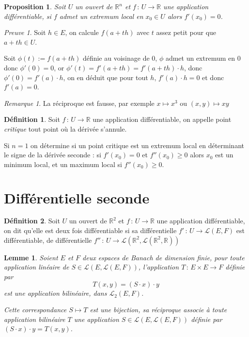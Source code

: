 \documentclass[]{article}
\newtheorem{myproposition}{Proposition}
\newtheorem{mylemma}{Lemme}
\theoremstyle{remark}
\newtheorem{myrem}{Remarque}
\newtheorem{myproof}{Preuve}
\theoremstyle{definition}
\newtheorem{mydef}{Définition}
\newcommand{\funcshort}[3]{
#1 \, : \, #2 \longrightarrow #3
}
\begin{document}
\begin{myproposition}
	Soit $U$ un ouvert de $\mathbb{R}^n$ et $\funcshort{f}{U}{\mathbb{R}}$ une application différentiable, si $f$ admet un extremum local en $x_0 \in U$ alors $f'(x_0) = 0$.
\end{myproposition}

\begin{myproof}
	Soit $h \in E$, on calcule $f(a+th)$ avec $t$ assez petit pour que $a + th \in U$.
	
	Soit $\phi(t) := f(a+th)$ définie au voisinage de 0, $\phi$ admet un extremum en 0 donc $\phi'(0) = 0$, or $\phi'(t) = f'(a+th) = f'(a+th) \cdot h$, donc $\phi'(0) = f'(a) \cdot h$, on en déduit que pour tout $h$, $f'(a) \cdot h = 0$ et donc $f'(a) = 0$.
\end{myproof}

\begin{myrem}
	La réciproque est fausse, par exemple $x \mapsto x^3$ ou $(x, y) \mapsto xy$
\end{myrem}

\begin{mydef}
	Soit $\funcshort{f}{U}{\mathbb{R}}$ une application différentiable, on appelle point \textit{critique} tout point où la dérivée s'annule.
\end{mydef}

Si $n=1$ on détermine si un point critique est un extremum local en déterminant le signe de la dérivée seconde : si $f'(x_0) = 0$ et $f''(x_0) \geqslant 0$ alors $x_0$ est un minimum local, et un maximum local si $f''(x_0) \geqslant 0$.

\section{Différentielle seconde}

\begin{mydef}
	Soit $U$ un ouvert de $\mathbb{R}^2$ et $\funcshort{f}{U}{\mathbb{R}}$ une application différentiable, on dit qu'elle est deux fois différentiable si sa différentielle $\funcshort{f'}{U}{\mathcal{L}(E, F)}$ est différentiable, de différentielle $\funcshort{f''}{U}{\mathcal{L}(\mathbb{R}^2, \mathcal{L}(\mathbb{R}^2, \mathbb{R}))}$
\end{mydef}

\begin{mylemma}
	Soient $E$ et $F$ deux espaces de Banach de dimension finie, pour toute application linéaire de $S \in \mathcal{L}(E, \mathcal{L}(E, F))$, l'application $\funcshort{T}{E \times E}{F}$ définie par
	$$T(x, y) = (S \cdot x) \cdot y$$
	est une application bilinéaire, dans $\mathcal{L}_2(E, F)$.
	
	Cette correspondance $S \mapsto T$ est une bijection, sa réciproque associe à toute application bilinéaire $T$ une application $S \in \mathcal{L}(E, \mathcal{L}(E, F))$ définie par $(S \cdot x) \cdot y = T(x, y)$.
\end{mylemma}
\end{document}
